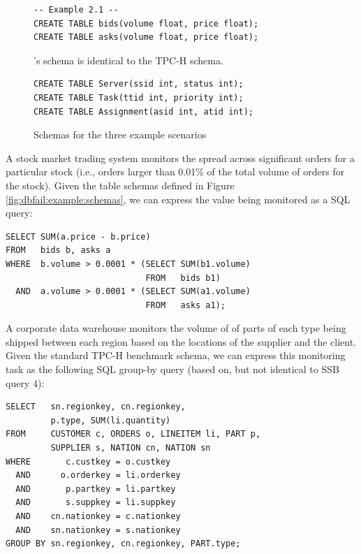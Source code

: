 \begin{figure}
\begin{verbatim}
-- Example 2.1 --
CREATE TABLE bids(volume float, price float);
CREATE TABLE asks(volume float, price float);
\end{verbatim}

's schema is identical to the TPC-H schema\cite{tpch}.

\begin{verbatim}
CREATE TABLE Server(ssid int, status int);
CREATE TABLE Task(ttid int, priority int);
CREATE TABLE Assignment(asid int, atid int);
\end{verbatim}

\label{fig:dbfail:schemas}
\caption{Schemas for the three example scenarios}
\end{figure}

\begin{example}
\label{ex:dbfail:stock}
A stock market trading system monitors the spread across significant orders for a particular stock (i.e., orders larger than 0.01\% of the total volume of orders for the stock).  Given the table schemas defined in Figure \ref{fig:dbfail:example:schemas}, we can express the value being monitored as a SQL query:
\begin{verbatim}
SELECT SUM(a.price - b.price)
FROM   bids b, asks a
WHERE  b.volume > 0.0001 * (SELECT SUM(b1.volume) 
                            FROM   bids b1)
  AND  a.volume > 0.0001 * (SELECT SUM(a1.volume) 
                            FROM   asks a1);
\end{verbatim}
\end{example}

\begin{example}
\label{ex:dbfail:tpch}
A corporate data warehouse monitors the volume of of parts of each type being shipped between each region based on the locations of the supplier and the client.  Given the standard TPC-H benchmark schema\cite{tpch}, we can express this monitoring task as the following SQL group-by query (based on, but not identical to SSB query 4\cite{ssb}): 
\begin{verbatim}
SELECT   sn.regionkey, cn.regionkey,
         p.type, SUM(li.quantity)
FROM     CUSTOMER c, ORDERS o, LINEITEM li, PART p, 
         SUPPLIER s, NATION cn, NATION sn
WHERE       c.custkey = o.custkey
  AND      o.orderkey = li.orderkey
  AND       p.partkey = li.partkey
  AND       s.suppkey = li.suppkey
  AND    cn.nationkey = c.nationkey
  AND    sn.nationkey = s.nationkey
GROUP BY sn.regionkey, cn.regionkey, PART.type;
\end{verbatim}
\end{example}

